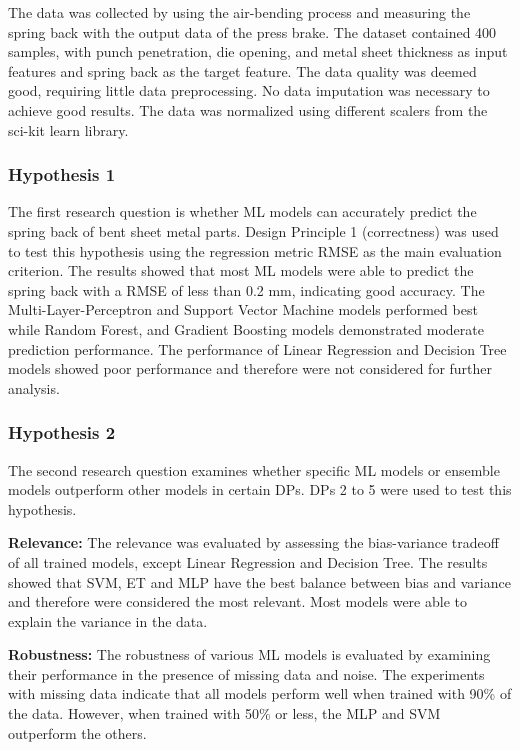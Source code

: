 The data was collected by using the air-bending process and measuring the spring back with the output data of the
press brake.
The dataset contained 400 samples, with punch penetration, die opening, and metal sheet thickness as
input features and spring back as the target feature.
The data quality was deemed good, requiring little data preprocessing.
No data imputation was necessary to achieve good results.
The data was normalized using different scalers from the sci-kit learn library.


\subsubsection{Hypothesis 1}

The first research question is whether ML models can accurately predict the spring back of bent sheet metal parts.
Design Principle 1 (correctness) was used to test this hypothesis using the regression metric RMSE as the main
evaluation criterion.
The results showed that most ML models were able to predict the spring back with a RMSE of less
than 0.2 mm, indicating good accuracy.
The Multi-Layer-Perceptron and Support Vector Machine models performed best while Random Forest, and Gradient
Boosting models
demonstrated
moderate prediction
performance.
The performance of Linear Regression and Decision Tree models showed poor performance and
therefore were not considered for further analysis.

\subsubsection{Hypothesis 2}

The second research question examines whether specific ML models or ensemble models outperform other models in certain
\ac{DP}s.
\ac{DP}s 2 to 5 were used to test this hypothesis.

\textbf{Relevance:} The relevance was evaluated by assessing the bias-variance tradeoff of all trained models, except
Linear Regression and
Decision Tree.
The results showed that \ac{SVM}, \ac{ET} and \ac{MLP} have the best balance
between bias and variance and therefore were considered the most relevant.
Most models were able to explain the variance in the data.


\textbf{Robustness:} The robustness of various ML models is evaluated by examining their performance in the presence of
missing data and noise.
The experiments with missing data indicate that all models perform well when trained with 90\% of the data.
However, when trained with 50\% or less, the MLP and SVM outperform the others.

